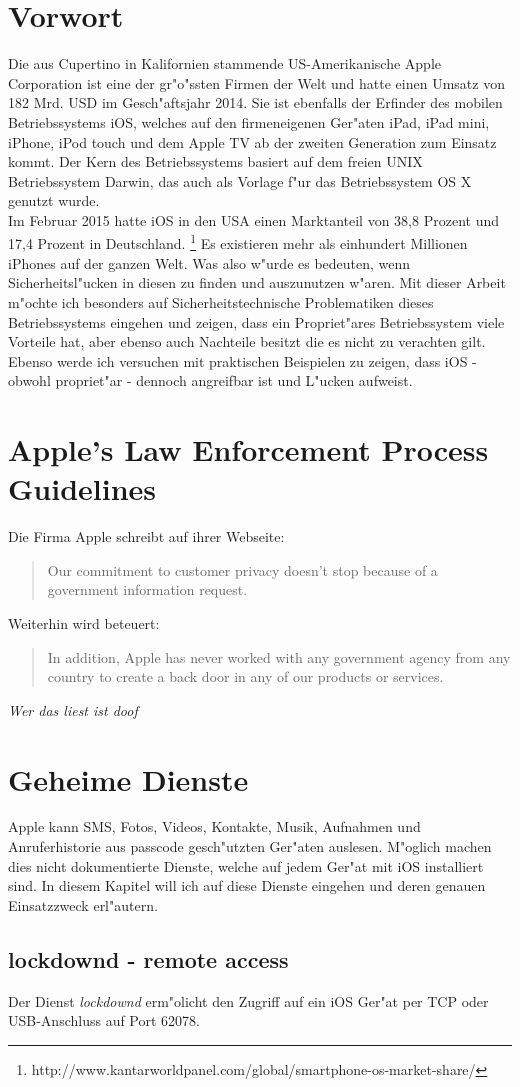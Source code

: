 \documentclass[12pt,a4paper]{scrartcl}
\begin{document}
	\section{Vorwort}
	Die aus Cupertino in Kalifornien stammende US-Amerikanische Apple Corporation
	ist eine der gr"o"ssten Firmen der Welt und hatte einen Umsatz von 182 Mrd.
	USD im Gesch"aftsjahr 2014. Sie ist ebenfalls der Erfinder des mobilen
	Betriebssystems iOS, welches auf den firmeneigenen Ger"aten iPad, iPad mini,
	iPhone, iPod touch und dem Apple TV ab der zweiten Generation zum Einsatz kommt.
	Der Kern des Betriebssystems basiert auf dem freien UNIX Betriebssystem Darwin,
	das auch als Vorlage f"ur das Betriebssystem OS X genutzt wurde.\\
	Im Februar 2015 hatte iOS in den USA einen Marktanteil von 38,8 Prozent und 17,4 Prozent in Deutschland.
	\footnote{http://www.kantarworldpanel.com/global/smartphone-os-market-share/}
	Es existieren mehr als einhundert Millionen iPhones auf der ganzen Welt. Was
	also w"urde es bedeuten, wenn Sicherheitsl"ucken in diesen zu finden und
	auszunutzen w"aren.
	Mit dieser Arbeit m"ochte ich besonders auf Sicherheitstechnische Problematiken
	dieses Betriebssystems eingehen und zeigen, dass ein Propriet"ares
	Betriebssystem viele Vorteile hat, aber ebenso auch Nachteile besitzt die es nicht zu verachten gilt. 
	Ebenso werde ich versuchen mit praktischen Beispielen zu zeigen, dass iOS -
	obwohl propriet"ar - dennoch angreifbar ist und L"ucken aufweist.
	\newpage
	\section{Apple's Law Enforcement Process Guidelines}
	Die Firma Apple schreibt auf ihrer Webseite:
	\begin{quote}
	Our commitment to customer privacy doesn't stop because of a government
	information request.
	\end{quote}
	Weiterhin wird beteuert: 
	\begin{quote}
	In addition, Apple has never worked with any government agency from any country to create a back door in any of our products or services.
	\end{quote}
	\textsl{Wer das liest ist doof}
	
	\newpage
	\section{Geheime Dienste}
	Apple kann SMS, Fotos, Videos, Kontakte, Musik, Aufnahmen und Anruferhistorie
	aus passcode gesch"utzten Ger"aten auslesen. M"oglich machen dies nicht
	dokumentierte Dienste, welche auf jedem Ger"at mit iOS installiert sind. In
	diesem Kapitel will ich auf diese Dienste eingehen und deren genauen
	Einsatzzweck erl"autern.
	\subsection{lockdownd - remote access}
	Der Dienst \textsl{lockdownd} erm"olicht den Zugriff auf ein iOS Ger"at
	per TCP oder USB-Anschluss auf Port 62078.
	\newpage
\end{document}
